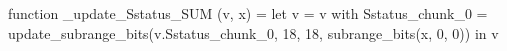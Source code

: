 function _update_Sstatus_SUM (v, x) = let v = { v with Sstatus_chunk_0 = update_subrange_bits(v.Sstatus_chunk_0, 18, 18, subrange_bits(x, 0, 0)) } in
  v

